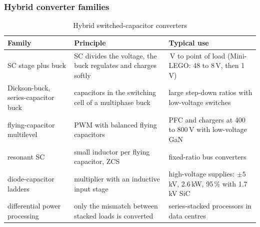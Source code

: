 \begin{frame}
	\frametitle{Hybrid converter families}
	\begin{table}
		\centering
		\scriptsize
		\begin{tabular}{|l|>{\raggedright\arraybackslash}p{4.1cm}|>{\raggedright\arraybackslash}p{5.4cm}|}
			\hline
			\textbf{Family}                 & \textbf{Principle}                                                  & \textbf{Typical use}                                                    \\
			\hline
			SC stage plus buck              & SC divides the voltage, the buck regulates and charges softly        & 48\,V to point of load (Mini-LEGO: 48 to 8\,V, then 1\,V)               \\
			Dickson-buck, series-capacitor buck & capacitors in the switching cell of a multiphase buck          & large step-down ratios with low-voltage switches                       \\
			flying-capacitor multilevel     & PWM with balanced flying capacitors                                  & PFC and chargers at 400 to 800\,V with low-voltage GaN                  \\
			resonant SC                     & small inductor per flying capacitor, ZCS                             & fixed-ratio bus converters                                             \\
			diode-capacitor ladders         & multiplier with an inductive input stage                             & high-voltage supplies: $\pm5$\,kV, 2.6\,kW, 95\,\% with 1.7\,kV SiC     \\
			differential power processing   & only the mismatch between stacked loads is converted                 & series-stacked processors in data centres                              \\
			\hline
		\end{tabular}
		\caption{Hybrid switched-capacitor converters}
	\end{table}
\end{frame}

